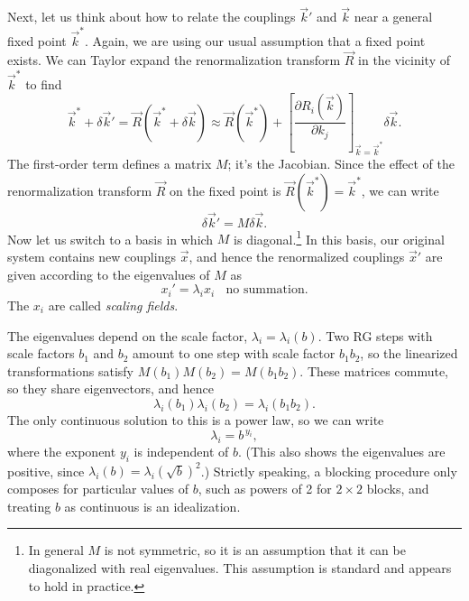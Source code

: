 Next, let us think about how to relate the couplings $\vec{k}'$ and $\vec{k}$
near a general fixed point $\vec{k}^*$. Again, we are using our usual assumption
that a fixed point exists.
We can Taylor expand the renormalization transform $\vec{R}$ in the vicinity of $\vec{k}^*$ to find
\begin{equation}
  \vec{k}^*+\delta\vec{k}'=\vec{R}\left(\vec{k}^*+\delta\vec{k}\right)
                          \approx\vec{R}(\vec{k}^*)
                           +\left[\frac{\partial R_i(\vec{k})}{\partial k_j}
                              \right]_{\vec{k}=\vec{k}^*}\delta\vec{k}.
\end{equation}
The first-order term defines a matrix $M$; it's the Jacobian.
Since the effect of the renormalization transform
$\vec{R}$ on the fixed point is $\vec{R}(\vec{k}^*)=\vec{k}^*$, we can write
\begin{equation}
  \delta\vec{k}'=M\delta\vec{k}.
\end{equation}
Now let us switch to a basis in which $M$ is diagonal.\footnote{In general $M$ is
not symmetric, so it is an assumption that it can be diagonalized with real
eigenvalues. This assumption is standard and appears to hold in practice.}
In this basis, our original system contains new couplings $\vec{x}$, and hence
the renormalized couplings $\vec{x}'$ are given according to the eigenvalues of
$M$ as
\begin{equation}
  x_i'=\lambda_i x_i~~~~\text{no summation}.
\end{equation}
The $x_i$ are called {\it scaling fields}.

The eigenvalues depend on the scale factor, $\lambda_i=\lambda_i(b)$.
Two RG steps with scale factors $b_1$ and $b_2$ amount to one step with
scale factor $b_1b_2$, so the linearized transformations satisfy
$M(b_1)M(b_2)=M(b_1b_2)$. These matrices commute, so they share eigenvectors,
and hence
\begin{equation}
  \lambda_i(b_1)\lambda_i(b_2)=\lambda_i(b_1b_2).
\end{equation}
The only continuous solution to this is a power law, so we can write
\begin{equation}\label{eq:RGeigenvalue}
  \lambda_i=b^{\,y_i},
\end{equation}
where the exponent $y_i$ is independent of $b$.
(This also shows the eigenvalues are positive, since
$\lambda_i(b)=\lambda_i(\sqrt{b})^2$.) Strictly speaking, a blocking
procedure only composes for particular values of $b$, such as powers of 2 for
$2\times2$ blocks, and treating $b$ as continuous is an idealization.

